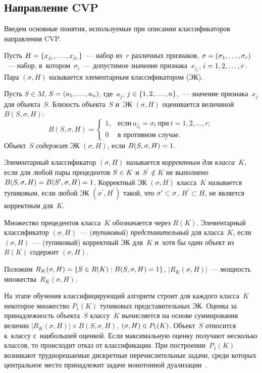\begin{multicols}{2}
\section{Направление CVP}

  Введем основные понятия, ис\-поль\-зу\-емые при описании классификаторов 
на\-прав\-ле\-ния CVP. 
  
  Пусть $H\hm= \{ x_{j_1}, \ldots , x_{j_r}\}$~--- набор из~$r$ раз\-лич\-ных 
при\-зна\-ков, $\sigma\hm= (\sigma_1, \ldots , \sigma_r)$~--- набор, 
в~котором~$\sigma_i$~--- до\-пус\-ти\-мое значение при\-зна\-ка~$x_{j_i}$, 
$i\hm=1,2,\ldots , r$. Пара $(\sigma, H)$ называется элементарным 
классификатором (ЭК).
  
  Пусть $S\in M$, $S\hm= (a_1, \ldots , a_n)$, где~$a_j$, $j\hm\in \{1,2,\ldots,  
n\}$,~--- значение при\-зна\-ка~$x_j$ для объекта~$S$. Бли\-зость объекта~$S$ и~ЭК 
$(\sigma, H)$ оценивается величиной $B(S, \sigma, H)$:
$$
B(S, \sigma, H)=\begin{cases}
1, &\mbox{если}\ a_{j_t}=\sigma_t\ \mbox{при}\ t= 1,2,\ldots , r;\\
0 & \mbox{в\ противном\ случае}.
\end{cases}
$$
 Объект~$S$ \textit{содержит} ЭК $(\sigma, H)$, если $B(S,\sigma, 
H)\hm=1$.
  
  Элементарный  классификатор $(\sigma, H)$ называется \textit{корректным для класса}~$K$, если для 
любой пары прецедентов $S\hm\in  K$ и~$S^\prime\notin K$ не выполнено
  $B(S, \sigma, H)\hm= B(S^\prime, \sigma, H)\hm=1$. Корректный ЭК $(\sigma, 
H)$ класса~$K$ называется тупиковым, если любой ЭК $(\sigma^\prime, 
H^\prime)$ такой, что $\sigma^\prime\hm \subset \sigma$, $H^\prime \subset H$, 
не является корректным для~$K$.
  
  Множество прецедентов класса~$K$ обо\-зна\-ча\-ет\-ся через $R(K)$. Элементарный  классификатор $(\sigma, 
H)$~--- (\textit{тупиковый}) \textit{пред\-ста\-ви\-тель\-ный} для класса~$K$, если 
$(\sigma, H)$~--- (тупиковый) корректный ЭК для~$K$ и~хотя бы один объект 
из $R(K)$ содержит $(\sigma, H)$. 
  
  Положим $R_K(\sigma, H) \hm= \{S\hm\in R(K): B(S,\sigma, H)\hm=1\}$, $\vert 
R_K(\sigma, H)\vert$~--- мощ\-ность множества~$R_K(\sigma, H)$. 
  
  На этапе обучения классифицирующий алгоритм строит для каж\-до\-го 
класса~$K$ некоторое множество $P_1(K)$ тупиковых пред\-ста\-ви\-тель\-ных ЭК. 
Оценка за при\-над\-леж\-ность объекта~$S$ классу~$K$ вы\-чис\-ля\-ет\-ся на основе 
суммирования величин $\vert R_K(\sigma, H)\vert \times B(S,\sigma, H)$, 
$(\sigma, H)\hm\in P_1(K)$. Объект~$S$ относится к~классу с~наибольшей 
оцен\-кой. Если максимальную оцен\-ку получают несколько классов, то 
происходит отказ от классификации. При по\-стро\-ении~$P_1(K)$ возникают 
труд\-но\-ре\-ша\-емые дис\-крет\-ные пе\-ре\-чис\-ли\-тель\-ные задачи, среди которых 
цент\-раль\-ное мес\-то принадлежит задаче монотонной дуализации~\cite{6-duk}.
  

\end{multicols}
